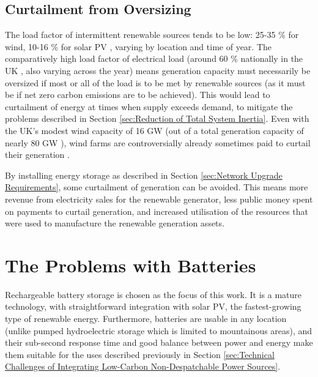 \documentclass[report_18month.tex]{subfiles}
\begin{document}
\subsection{Curtailment from Oversizing}
The load factor of intermittent renewable sources tends to be low: 25-35 \% for wind, 10-16 \% for solar PV \citep{carbajales2014storage}, varying by location and time of year. The comparatively high load factor of electrical load (around 60 \% nationally in the UK \citep{gridwatch2017}, also varying across the year) means generation capacity must necessarily be oversized if most or all of the load is to be met by renewable sources (as it must be if net zero carbon emissions are to be achieved). This would lead to curtailment of energy at times when supply exceeds demand, to mitigate the problems described in Section \ref{sec:Reduction of Total System Inertia}. Even with the UK's modest wind capacity of 16 GW \citep{beis2017renewables} (out of a total generation capacity of nearly 80 GW \citep{beis2017cap}), wind farms are controversially already sometimes paid to curtail their generation \citep{blake2017windcurtail}.

By installing energy storage as described in Section \ref{sec:Network Upgrade Requirements}, some curtailment of generation can be avoided. This means more revenue from electricity sales for the renewable generator, less public money spent on payments to curtail generation, and increased utilisation of the resources that were used to manufacture the renewable generation assets.

\section{The Problems with Batteries}
Rechargeable battery storage is chosen as the focus of this work. It is a mature technology, with straightforward integration with solar PV, the fastest-growing type of renewable energy. Furthermore, batteries are usable in any location (unlike pumped hydroelectric storage which is limited to mountainous areas), and their sub-second response time and good balance between power and energy \citep{luo2015overview} make them suitable for the uses described previously in Section \ref{sec:Technical Challenges of Integrating Low-Carbon Non-Despatchable Power Sources}.
\end{document}
